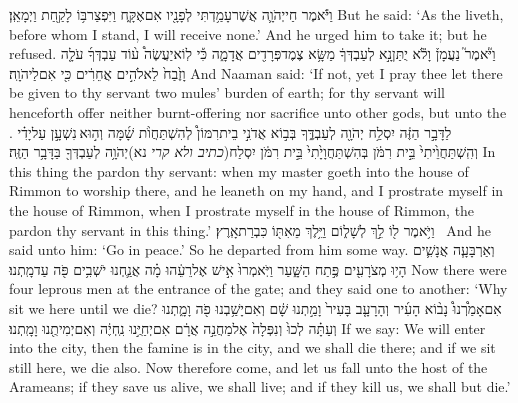 {וַיֹּ֕אמֶר חַי\maqqaf יְהֹוָ֛ה אֲשֶׁר\maqqaf עָמַ֥דְתִּי לְפָנָ֖יו אִם\maqqaf אֶקָּ֑ח וַיִּפְצַר\maqqaf בּ֥וֹ לָקַ֖חַת וַיְמָאֵֽן׃}
{But he said: ‘As the \lord\space liveth, before whom I stand, I will receive none.’ And he urged him to take it; but he refused.}
{וַיֹּ֘אמֶר֮ נַעֲמָן֒ וָלֹ֕א יֻתַּן\maqqaf נָ֣א לְעַבְדְּךָ֔ מַשָּׂ֥א צֶמֶד\maqqaf פְּרָדִ֖ים אֲדָמָ֑ה כִּ֡י לֽוֹא\maqqaf יַעֲשֶׂה֩ ע֨וֹד עַבְדְּךָ֜ עֹלָ֤ה וָזֶ֙בַח֙ לֵאלֹהִ֣ים אֲחֵרִ֔ים כִּ֖י אִם\maqqaf לַיהֹוָֽה׃}
{And Naaman said: ‘If not, yet I pray thee let there be given to thy servant two mules’ burden of earth; for thy servant will henceforth offer neither burnt-offering nor sacrifice unto other gods, but unto the \lord.}
{לַדָּבָ֣ר הַזֶּ֔ה יִסְלַ֥ח יְהֹוָ֖ה לְעַבְדֶּ֑ךָ בְּב֣וֹא אֲדֹנִ֣י בֵית\maqqaf רִמּוֹן֩ לְהִשְׁתַּחֲוֺ֨ת שָׁ֜מָּה וְה֣וּא \legarmeh  נִשְׁעָ֣ן עַל\maqqaf יָדִ֗י וְהִֽשְׁתַּחֲוֵ֙יתִי֙ בֵּ֣ית רִמֹּ֔ן בְּהִשְׁתַּחֲוָיָ֙תִי֙ בֵּ֣ית רִמֹּ֔ן יִסְלַח\maqqaf (\textit{כתיב ולא קרי} נא)\maqqaf יְהֹוָ֥ה לְעַבְדְּךָ֖ בַּדָּבָ֥ר הַזֶּֽה׃}
{In this thing the \lord\space pardon thy servant: when my master goeth into the house of Rimmon to worship there, and he leaneth on my hand, and I prostrate myself in the house of Rimmon, when I prostrate myself in the house of Rimmon, the \lord\space pardon thy servant in this thing.’}
{וַיֹּ֥אמֶר ל֖וֹ לֵ֣ךְ לְשָׁל֑וֹם וַיֵּ֥לֶךְ מֵאִתּ֖וֹ כִּבְרַת\maqqaf אָֽרֶץ׃ \setuma }
{And he said unto him: ‘Go in peace.’ So he departed from him some way.}
\newperek
{}
\label{haft_28}
\setcounter{chap}{7}
\setcounter{verse}{3}
{וְאַרְבָּעָ֧ה אֲנָשִׁ֛ים הָי֥וּ מְצֹרָעִ֖ים פֶּ֣תַח הַשָּׁ֑עַר וַיֹּֽאמְרוּ֙ אִ֣ישׁ אֶל\maqqaf רֵעֵ֔הוּ מָ֗ה אֲנַ֛חְנוּ יֹשְׁבִ֥ים פֹּ֖ה עַד\maqqaf מָֽתְנוּ׃}
{Now there were four leprous men at the entrance of the gate; and they said one to another: ‘Why sit we here until we die?}
{אִם\maqqaf אָמַ֩רְנוּ֩ נָב֨וֹא הָעִ֜יר וְהָרָעָ֤ב בָּעִיר֙ וָמַ֣תְנוּ שָׁ֔ם וְאִם\maqqaf יָשַׁ֥בְנוּ פֹ֖ה וָמָ֑תְנוּ וְעַתָּ֗ה לְכוּ֙ וְנִפְּלָה֙ אֶל\maqqaf מַחֲנֵ֣ה אֲרָ֔ם אִם\maqqaf יְחַיֻּ֣נוּ נִֽחְיֶ֔ה וְאִם\maqqaf יְמִיתֻ֖נוּ וָמָֽתְנוּ׃}
{If we say: We will enter into the city, then the famine is in the city, and we shall die there; and if we sit still here, we die also. Now therefore come, and let us fall unto the host of the Arameans; if they save us alive, we shall live; and if they kill us, we shall but die.’}

